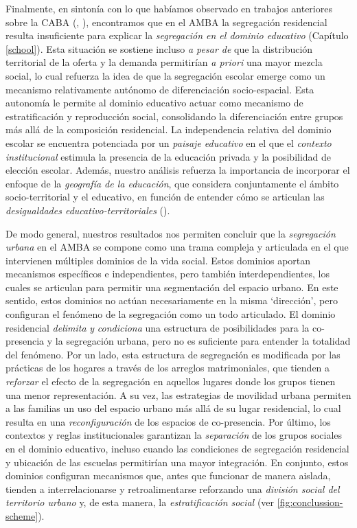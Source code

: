 \documentclass[
  spanish,
  a4paper,%
  chapterprefix=true,%
  DIV=calc,%
  twoside]{scrbook}%
\begin{document}
Finalmente, en sintonía con lo que habíamos observado en trabajos
anteriores sobre la CABA (, ), encontramos que
en el AMBA la segregación residencial resulta insuficiente para explicar
la \emph{segregación en el dominio educativo} (Capítulo \ref{school}). Esta
situación se sostiene incluso \emph{a pesar de} que la distribución
territorial de la oferta y la demanda permitirían \emph{a priori} una mayor
mezcla social, lo cual refuerza la idea de que la segregación escolar
emerge como un mecanismo relativamente autónomo de diferenciación
socio-espacial. Esta autonomía le permite al dominio educativo actuar
como mecanismo de estratificación y reproducción social, consolidando la
diferenciación entre grupos más allá de la composición residencial. La
independencia relativa del dominio escolar se encuentra potenciada por
un \emph{paisaje educativo} en el que el \emph{contexto institucional} estimula la
presencia de la educación privada y la posibilidad de elección escolar.
Además, nuestro análisis refuerza la importancia de incorporar el
enfoque de la \emph{geografía de la educación}, que considera conjuntamente
el ámbito socio-territorial y el educativo, en función de entender cómo
se articulan las \emph{desigualdades educativo-territoriales} ().

De modo general, nuestros resultados nos permiten concluir que la
\emph{segregación urbana} en el AMBA se compone como una trama compleja y
articulada en el que intervienen múltiples dominios de la vida social.
Estos dominios aportan mecanismos específicos e independientes, pero
también interdependientes, los cuales se articulan para permitir una
segmentación del espacio urbano. En este sentido, estos dominios no
actúan necesariamente en la misma `dirección', pero configuran el
fenómeno de la segregación como un todo articulado. El dominio
residencial \emph{delimita} \emph{y} \emph{condiciona} una estructura de posibilidades
para la co-presencia y la segregación urbana, pero no es suficiente para
entender la totalidad del fenómeno. Por un lado, esta estructura de
segregación es modificada por las prácticas de los hogares a través de
los arreglos matrimoniales, que tienden a \emph{reforzar} el efecto de la
segregación en aquellos lugares donde los grupos tienen una menor
representación. A su vez, las estrategias de movilidad urbana permiten a
las familias un uso del espacio urbano más allá de su lugar residencial,
lo cual resulta en una \emph{reconfiguración} de los espacios de
co-presencia. Por último, los contextos y reglas institucionales
garantizan la \emph{separación} de los grupos sociales en el dominio
educativo, incluso cuando las condiciones de segregación residencial y
ubicación de las escuelas permitirían una mayor integración. En
conjunto, estos dominios configuran mecanismos que, antes que funcionar
de manera aislada, tienden a interrelacionarse y retroalimentarse
reforzando una \emph{división social del territorio urbano} y, de esta
manera, la \emph{estratificación social} (ver \ref{fig:conclussion-scheme}).
\end{document}
